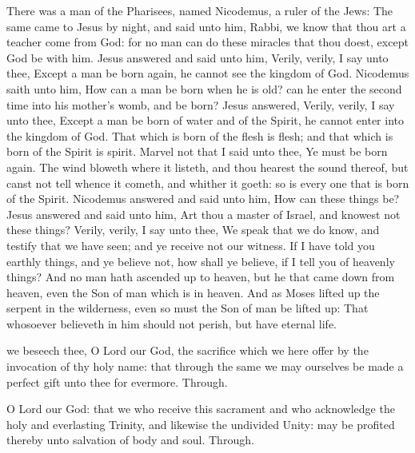  There was a man of the Pharisees, named Nicodemus, a ruler of the Jews: The same came to Jesus by night, and said unto him, Rabbi, we know that thou art a teacher come from God: for no man can do these miracles that thou doest, except God be with him. Jesus answered and said unto him, Verily, verily, I say unto thee, Except a man be born again, he cannot see the kingdom of God. Nicodemus saith unto him, How can a man be born when he is old? can he enter the second time into his mother's womb, and be born? Jesus answered, Verily, verily, I say unto thee, Except a man be born of water and of the Spirit, he cannot enter into the kingdom of God. That which is born of the flesh is flesh; and that which is born of the Spirit is spirit. Marvel not that I said unto thee, Ye must be born again. The wind bloweth where it listeth, and thou hearest the sound thereof, but canst not tell whence it cometh, and whither it goeth: so is every one that is born of the Spirit. Nicodemus answered and said unto him, How can these things be? Jesus answered and said unto him, Art thou a master of Israel, and knowest not these things? Verily, verily, I say unto thee, We speak that we do know, and testify that we have seen; and ye receive not our witness. If I have told you earthly things, and ye believe not, how shall ye believe, if I tell you of heavenly things? And no man hath ascended up to heaven, but he that came down from heaven, even the Son of man which is in heaven. And as Moses lifted up the serpent in the wilderness, even so must the Son of man be lifted up: That whosoever believeth in him should not perish, but have eternal life.


\secret
{} we beseech thee, O Lord our God, the sacrifice which we here offer by the invocation of thy holy name: that through the same we may ourselves be made a perfect gift unto thee for evermore. Through.
%

\postcommunion
{} O Lord our God: that we who receive this sacrament and who acknowledge the holy and everlasting Trinity, and likewise the undivided Unity: may be profited thereby unto salvation of body and soul. Through.

